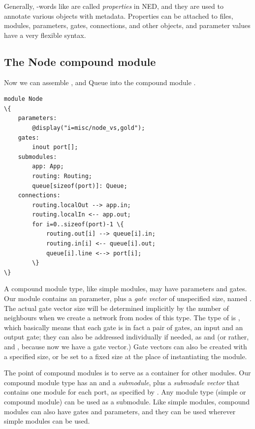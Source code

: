 Generally, -words like  are called \textit{properties}
in NED, and they are used to annotate various objects
with metadata. Properties can be attached to files, modules, parameters, gates,
connections, and other objects, and parameter values have a very flexible
syntax.


\subsection{The Node compound module}

Now we can assemble ,  and {Queue} into the
compound module .

\begin{Verbatim}[commandchars=\\\{\}]
module Node
\{
    parameters:
        @display("i=misc/node_vs,gold");
    gates:
        inout port[];
    submodules:
        app: App;
        routing: Routing;
        queue[sizeof(port)]: Queue;
    connections:
        routing.localOut --> app.in;
        routing.localIn <-- app.out;
        for i=0..sizeof(port)-1 \{
            routing.out[i] --> queue[i].in;
            routing.in[i] <-- queue[i].out;
            queue[i].line <--> port[i];
        \}
\}
\end{Verbatim}

A compound module type, like simple modules, may have parameters and gates.
Our  module contains an  parameter, plus a
\textit{gate vector} of unspecified size, named .
The actual gate vector size will be determined implicitly by the number
of neighbours when we create a network from nodes of this type.
The type of  is , which basically means that
each gate is in fact a pair of gates, an input and an output gate;
they can also be addressed individually if needed, as  and
 (or rather,  and ,
because now we have a gate vector.) Gate vectors can also be created with
a specified size, or be set to a fixed size at the place
of instantiating the module.

The point of compound modules is to serve as a container for other
modules. Our  compound module type has an  and
a  \textit{submodule}, plus a  \textit{submodule vector}
that contains one  module for each port, as specified by
.
Any module type (simple or compound module) can be used as a submodule.
Like simple modules, compound modules can also have gates and parameters,
and they can be used wherever simple modules can be used.

